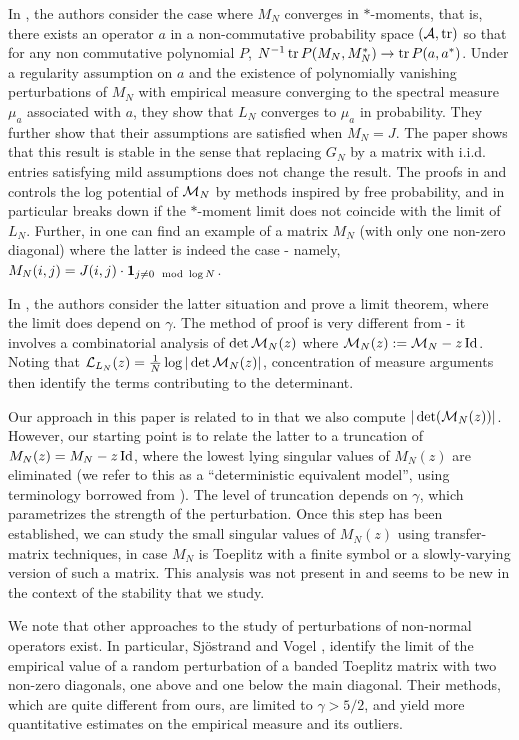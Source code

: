 \documentclass{amsart}
\numberwithin{equation}{section}
\def\corAB{}
\begin{document}
In \cite{GWZ}, the authors consider the case where $M_N$ converges in
$*$-moments, that is, there exists an operator $a$ in a non-commutative
probability space $(\mathcal{A}, \operatorname{tr})$ so that for any non commutative
polynomial $P$, $N^{-1}\operatorname{tr} P(M_N, M_N^*)\to \operatorname{tr} P(a,a^*)$. Under a regularity
assumption on $a$ and the existence of polynomially vanishing perturbations
of $M_N$ with empirical measure converging to the spectral
measure $\mu_a$ associated with $a$,
they show that $L_N$ converges to $\mu_a$ in probability.
They further show that their assumptions are satisfied
when $M_N=J$. The paper \cite{W} shows that this result is stable in the sense
that replacing $G_N$ by a matrix with i.i.d. entries satisfying mild assumptions
does not change the result. The proofs in \cite{GWZ} and \cite{W} controls
the log potential of $\mathcal{M}_N$ by methods inspired by free probability, and in particular breaks down if the $*$-moment limit does not coincide
with the limit of $L_N$. Further, in \cite{GWZ} one can
find an example of a matrix $M_N$ (with only one non-zero diagonal)
where the latter is indeed the case - namely, $M_N(i,j)=J(i,j)\cdot
{\bf 1}_{j\neq 0 \mod \log N}$.

In \cite{FPZ}, the authors consider the latter situation and prove a limit
theorem, where the limit does depend on $\gamma$. The method of proof is very
different from \cite{GWZ,W} - it involves a combinatorial analysis of
$\det \mathcal{M}_N(z)$ where $\mathcal{M}_N(z):=\mathcal{M}_N-z\operatorname{Id}$. \corAB{Noting that $\mathcal{L}_{L_N}(z)=
\frac1N \log |\det \mathcal{M}_N(z)|$, concentration
of measure arguments then identify the terms contributing to the determinant.}


Our approach in this paper is related to \cite{FPZ} in that we also compute
$|\det(\mathcal{M}_N(z))|$. However, our starting point is to relate the latter
to a truncation of $M_N(z)=M_N-z\operatorname{Id}$, where the lowest lying singular values
of $M_N(z)$ are eliminated (we refer to this as a ``deterministic
equivalent model'', using terminology borrowed from \cite{hachem}).
The level of truncation depends on $\gamma$, which parametrizes the
strength of the perturbation.
Once this step has been established, we can study the small singular values
of $M_N(z)$ using transfer-matrix techniques, in case
$M_N$ is Toeplitz with a finite symbol or a
slowly-varying version of such a matrix. This analysis was not present
in \cite{GWZ,FPZ,W} and seems to be new in the context of the stability that
we study.

We note that other approaches to the study of perturbations of non-normal
operators exist. In particular, Sj\"{o}strand and Vogel \cite{SV},
\cite{SV1}
identify the limit of the empirical value of a random perturbation of
a  banded Toeplitz matrix
with two non-zero diagonals, one above and one below the main
diagonal. Their methods, which are quite different
from ours, are limited to $\gamma>5/2$, and yield more quantitative
estimates on the empirical measure and its outliers.
\end{document}
